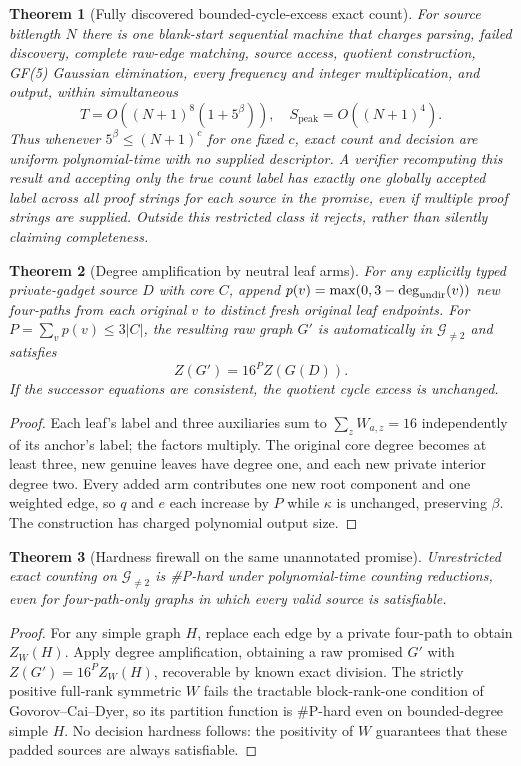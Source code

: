\documentclass[11pt]{article}
\newtheorem{theorem}{Theorem}
\begin{document}
\begin{theorem}[Fully discovered bounded-cycle-excess exact count]
For source bitlength $N$ there is one blank-start sequential machine that charges parsing, failed discovery, complete raw-edge matching, source access, quotient construction, GF(5) Gaussian elimination, every frequency and integer multiplication, and output, within simultaneous
\[
 \boxed{T=O((N+1)^8(1+5^\beta)),\quad S_{\mathrm{peak}}=O((N+1)^4).}
\]
Thus whenever $5^\beta\le(N+1)^c$ for one fixed $c$, exact count and decision are uniform polynomial-time with no supplied descriptor. A verifier recomputing this result and accepting only the true count label has exactly one globally accepted label across all proof strings for each source in the promise, even if multiple proof strings are supplied. Outside this restricted class it rejects, rather than silently claiming completeness.
\end{theorem}

\begin{theorem}[Degree amplification by neutral leaf arms]
For \emph{any} explicitly typed private-gadget source $D$ with core $C$, append $p(v)=\max(0,3-\deg_{\rm undir}(v))$ new four-paths from each original $v$ to distinct fresh original leaf endpoints. For $P=\sum_vp(v)\le3|C|$, the resulting raw graph $G'$ is automatically in $\mathcal G_{\ne2}$ and satisfies
\[
 \boxed{Z(G')=16^P Z(G(D)).}
\]
If the successor equations are consistent, the quotient cycle excess is unchanged.
\end{theorem}
\begin{proof}
Each leaf's label and three auxiliaries sum to $\sum_z W_{a,z}=16$ independently of its anchor's label; the factors multiply. The original core degree becomes at least three, new genuine leaves have degree one, and each new private interior degree two. Every added arm contributes one new root component and one weighted edge, so $q$ and $e$ each increase by $P$ while $\kappa$ is unchanged, preserving $\beta$. The construction has charged polynomial output size.
\end{proof}

\begin{theorem}[Hardness firewall on the same unannotated promise]
Unrestricted \emph{exact counting} on $\mathcal G_{\ne2}$ is \#P-hard under polynomial-time counting reductions, even for four-path-only graphs in which every valid source is satisfiable.
\end{theorem}
\begin{proof}
For any simple graph $H$, replace each edge by a private four-path to obtain $Z_W(H)$. Apply degree amplification, obtaining a raw promised $G'$ with $Z(G')=16^PZ_W(H)$, recoverable by known exact division. The strictly positive full-rank symmetric $W$ fails the tractable block-rank-one condition of Govorov--Cai--Dyer, so its partition function is \#P-hard even on bounded-degree simple $H$. No decision hardness follows: the positivity of $W$ guarantees that these padded sources are always satisfiable.
\end{proof}
\end{document}
